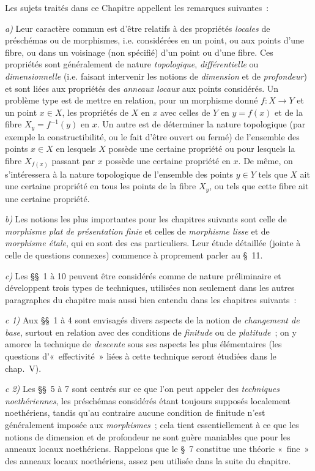 \documentclass[10pt,oneside]{book}
\newcommand{\oldpage}[2][]{%
  \setcounter{footnote}{0}%
  \marginpar{\scriptsize\textbf{#1}~|~#2}\ignorespaces}
\begin{document}
\clearpage
\oldpage[IV-1]{223}

Les sujets traités dans ce Chapitre appellent les remarques suivantes~:

\medskip
\noindent
\emph{a)} Leur caractère commun est d'être relatifs à des propriétés
\emph{locales} de préschémas ou de morphismes, i.e. considérées en un point,
ou aux points d'une fibre, ou dans un voisinage (non spécifié) d'un point ou
d'une fibre. Ces propriétés sont généralement de nature \emph{topologique},
\emph{différentielle} ou \emph{dimensionnelle} (i.e. faisant intervenir les
notions de \emph{dimension} et de \emph{profondeur}) et sont liées aux
propriétés des \emph{anneaux locaux} aux points considérés. Un problème type
est de mettre en relation, pour un morphisme donné $f:X\to Y$ et un point
$x\in X$, les propriétés de $X$ en $x$ avec celles de $Y$ en $y=f(x)$ et de
la fibre $X_y=f^{-1}(y)$ en $x$. Un autre est de déterminer la nature
topologique (par exemple la constructibilité, ou le fait d'être ouvert ou
fermé) de l'ensemble des points $x\in X$ en lesquels $X$ possède une certaine
propriété ou pour lesquels la fibre $X_{f(x)}$ passant par $x$ possède une
certaine propriété en $x$. De même, on s'intéressera à la nature topologique
de l'ensemble des points $y\in Y$ tels que $X$ ait une certaine propriété en
tous les points de la fibre $X_y$, ou tels que cette fibre ait une certaine
propriété.

\medskip
\noindent
\emph{b)} Les notions les plus importantes pour les chapitres suivants sont
celle de \emph{morphisme plat de présentation finie} et celles de
\emph{morphisme lisse} et de \emph{morphisme étale}, qui en sont des cas
particuliers. Leur étude détaillée (jointe à celle de questions connexes)
commence à proprement parler au §~11.

\medskip
\noindent
\emph{c)} Les §§~1 à 10 peuvent être considérés comme de nature préliminaire
et développent trois types de techniques, utilisées non seulement dans les
autres paragraphes du chapitre mais aussi bien entendu dans les chapitres
suivants~:

\medskip
\noindent
\emph{c 1)} Aux §§~1 à 4 sont envisagés divers aspects de la notion de
\emph{changement de base}, surtout en relation avec des conditions de
\emph{finitude} ou de \emph{platitude}~; on y amorce la technique de
\emph{descente} sous ses aspects les plus élémentaires (les questions
d'«~effectivité~» liées à cette technique seront étudiées dans le chap.~V).

\medskip
\noindent
\emph{c 2)} Les §§~5 à 7 sont centrés sur ce que l'on peut appeler des
\emph{techniques noethériennes}, les préschémas considérés étant toujours
supposés localement noethériens, tandis qu'au contraire aucune condition de
finitude n'est généralement imposée aux \emph{morphismes}~; cela tient
essentiellement à ce que les notions de dimension et de profondeur ne sont
guère maniables que pour les anneaux locaux noethériens. Rappelons que le §~7
constitue une théorie «~fine~» des anneaux locaux noethériens, assez peu
utilisée dans la suite du chapitre.
\end{document}
